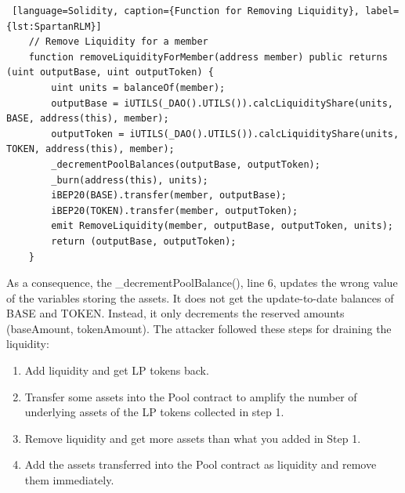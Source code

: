 \begin{lstlisting} [language=Solidity, caption={Function for Removing Liquidity}, label={lst:SpartanRLM}]
    // Remove Liquidity for a member
    function removeLiquidityForMember(address member) public returns (uint outputBase, uint outputToken) {
        uint units = balanceOf(member);
        outputBase = iUTILS(_DAO().UTILS()).calcLiquidityShare(units, BASE, address(this), member);
        outputToken = iUTILS(_DAO().UTILS()).calcLiquidityShare(units, TOKEN, address(this), member);
        _decrementPoolBalances(outputBase, outputToken);
        _burn(address(this), units);
        iBEP20(BASE).transfer(member, outputBase);
        iBEP20(TOKEN).transfer(member, outputToken);
        emit RemoveLiquidity(member, outputBase, outputToken, units);
        return (outputBase, outputToken);
    }
\end{lstlisting}
As a consequence, the \_decrementPoolBalance(), line 6, updates the  wrong value of the variables storing the assets. 
It does not get the update-to-date balances of BASE and TOKEN. Instead, it only decrements the reserved amounts (baseAmount, tokenAmount).
The attacker followed these steps for draining the liquidity:
\begin{enumerate}
    \item Add liquidity and get LP tokens back.
    \item Transfer some assets into the Pool contract to amplify the number of underlying assets of the LP tokens collected in step 1.
    \item Remove liquidity and get more assets than what you added in Step 1.
    \item Add the assets transferred into the Pool contract as liquidity and remove them immediately.
\end{enumerate}

